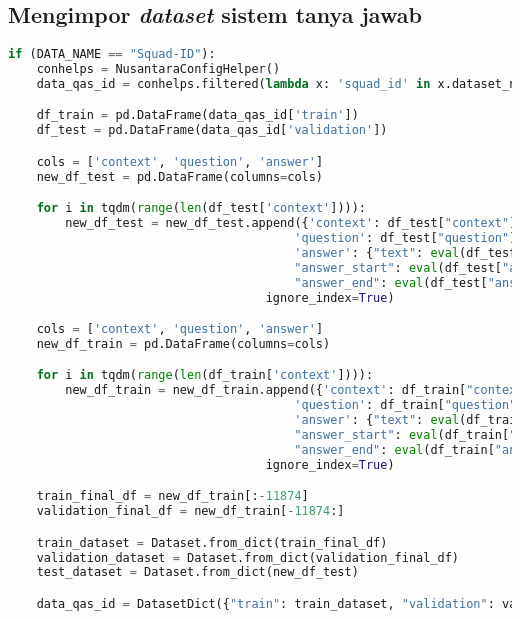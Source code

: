 \subsection{Mengimpor \emph{dataset} sistem tanya jawab}
\begin{lstlisting}[language=Python, caption=Mengimpor \emph{dataset} sistem tanya jawab]
if (DATA_NAME == "Squad-ID"):
    conhelps = NusantaraConfigHelper()
    data_qas_id = conhelps.filtered(lambda x: 'squad_id' in x.dataset_name)[0].load_dataset()

    df_train = pd.DataFrame(data_qas_id['train'])
    df_test = pd.DataFrame(data_qas_id['validation'])

    cols = ['context', 'question', 'answer']
    new_df_test = pd.DataFrame(columns=cols)

    for i in tqdm(range(len(df_test['context']))):
        new_df_test = new_df_test.append({'context': df_test["context"][i], 
                                        'question': df_test["question"][i], 
                                        'answer': {"text": eval(df_test["answer"][i][0])['text'], 
                                        "answer_start": eval(df_test["answer"][i][0])['answer_start'], 
                                        "answer_end": eval(df_test["answer"][i][0])['answer_end']}}, 
                                    ignore_index=True)

    cols = ['context', 'question', 'answer']
    new_df_train = pd.DataFrame(columns=cols)

    for i in tqdm(range(len(df_train['context']))):
        new_df_train = new_df_train.append({'context': df_train["context"][i], 
                                        'question': df_train["question"][i], 
                                        'answer': {"text": eval(df_train["answer"][i][0])['text'], 
                                        "answer_start": eval(df_train["answer"][i][0])['answer_start'], 
                                        "answer_end": eval(df_train["answer"][i][0])['answer_end']}}, 
                                    ignore_index=True)

    train_final_df = new_df_train[:-11874]
    validation_final_df = new_df_train[-11874:]

    train_dataset = Dataset.from_dict(train_final_df)
    validation_dataset = Dataset.from_dict(validation_final_df)
    test_dataset = Dataset.from_dict(new_df_test)

    data_qas_id = DatasetDict({"train": train_dataset, "validation": validation_dataset, "test": test_dataset})


\end{lstlisting}
